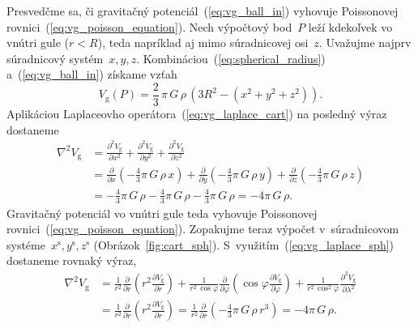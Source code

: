 \documentclass[a4paper, 12pt]{book}
\newcommand{\gidx}{\mathrm g}
\begin{document}
Presvedčme sa, či gravitačný potenciál~(\ref{eq:vg_ball_in}) vyhovuje 
Poissonovej rovnici~(\ref{eq:vg_poisson_equation}).  Nech výpočtový bod~$P$ 
leží kdekoľvek vo vnútri gule ($r < R$), teda napríklad aj mimo súradnicovej 
osi~$z$.  Uvažujme najprv súradnicový systém~$x, y, z$.  
Kombináciou~(\ref{eq:spherical_radius}) a~(\ref{eq:vg_ball_in}) získame vzťah
%
\begin{equation}
V_\gidx(P) = \frac{2}{3} \, \pi \, G \, \rho \, \left(3 R^2 - (x^2 + y^2 
+ z^2)\right){.}
\end{equation}
%
Aplikáciou Laplaceovho operátora~(\ref{eq:vg_laplace_cart}) na posledný výraz 
dostaneme
%
\begin{equation}
\label{eq:vg_homogeneous_ball_poisson}
\begin{split}
\nabla^2 V_\gidx &= \frac{\partial^2 V_\gidx}{\partial x^2} + \frac{\partial^2 
V_\gidx}{\partial y^2} + \frac{\partial^2 V_\gidx}{\partial z^2}\\
%
&= \frac{\partial}{\partial x} \left( -\frac{4}{3} \pi \, G \, \rho \, 
x \right) + \frac{\partial}{\partial y} \left( -\frac{4}{3} \pi \, G \, \rho \, 
y \right) + \frac{\partial}{\partial z} \left( -\frac{4}{3} \pi \, G \, \rho \, 
z \right)\\
%
&= -\frac{4}{3} \pi \, G \, \rho - \frac{4}{3} \pi \, G \, \rho - \frac{4}{3} 
\pi \, G \, \rho = -4 \pi \, G \, \rho{.}
\end{split}
\end{equation}
%
Gravitačný potenciál vo vnútri gule teda vyhovuje Poissonovej 
rovnici~(\ref{eq:vg_poisson_equation}).  Zopakujme teraz výpočet v~súradnicovom 
systéme~$x^\mathrm{s}, y^\mathrm{s}, z^\mathrm{s}$ 
(Obrázok~\ref{fig:cart_sph}).  S~využitím~(\ref{eq:vg_laplace_sph}) dostaneme 
rovnaký výraz,
%
\begin{equation}
\begin{split}
\nabla^2 V_\gidx &= \frac{1}{r^2} \frac{\partial}{\partial r} \left( r^2 
\frac{\partial V_\gidx}{\partial r} \right) + \frac{1}{r^2 \, \cos\varphi} 
\frac{\partial}{\partial \varphi} \left( \cos\varphi \frac{\partial 
V_\gidx}{\partial \varphi} \right) + \frac{1}{r^2 \, 
\cos^2\varphi}\frac{\partial^2 V_\gidx}{\partial \lambda^2}\\
%
&= \frac{1}{r^2} \frac{\partial}{\partial r} \left( r^2 \frac{\partial 
V_\gidx}{\partial r} \right) = \frac{1}{r^2} \frac{\partial}{\partial r} \left( 
-\frac{4}{3} \pi \, G \, \rho \, r^3 \right) = -4 \pi \, G \, \rho{.}
\end{split}
\end{equation}
\end{document}
